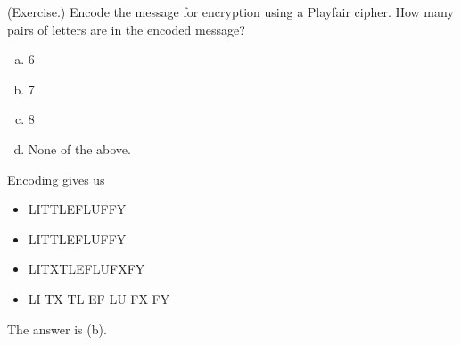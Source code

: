 \documentclass[letterpaper]{article}
\begin{document}
\begin{mdframed}
    (Exercise.) Encode the message  for encryption using a Playfair cipher. How many pairs of letters are in the encoded message? 

    \begin{enumerate}[(a)]
        \item 6
        \item 7
        \item 8
        \item None of the above. 
    \end{enumerate}

    \begin{mdframed}
        Encoding gives us 
        \begin{itemize}
            \item LITTLEFLUFFY
            \item LITTLEFLUFFY
            \item LITXTLEFLUFXFY
            \item LI TX TL EF LU FX FY
        \end{itemize}
        The answer is (b). 
    \end{mdframed}
\end{mdframed}
\end{document}
